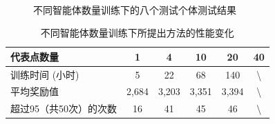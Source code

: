\begin{figure}[htbp]
  \quad\quad
  \\
  \quad\quad
  \caption{不同智能体数量训练下的八个测试个体测试结果}
  \label{agents}
\end{figure}

\begin{table}[htbp]
\centering
\caption{不同智能体数量训练下所提出方法的性能变化}
\label{cluster_size}
\renewcommand{\arraystretch}{1.2} %
\setlength{\tabcolsep}{6mm} %
\small %

\begin{tabular}{lccccc}
\toprule
代表点数量     & 1  & 4  & 10 & 20  & 40                \\ \midrule
训练时间 (小时)  & 5        & 22        & 68         & 140        & \textbackslash{}       \\
平均奖励值 & 2,684      & 3,203      & 3,351       & 3,394        & \textbackslash{}   \\
超过95（共50次）的次数     & 16        & 41         & 45          & 46          & \textbackslash{}\\ \bottomrule
\end{tabular}
\end{table}

